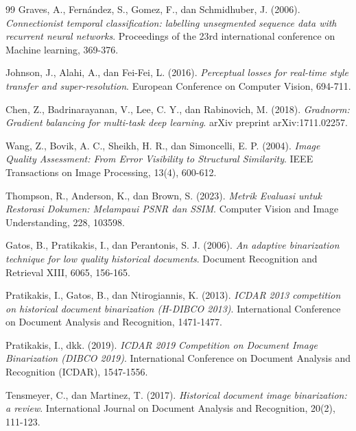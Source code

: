 \documentclass[12pt,a4paper]{book}
\begin{document}
\begin{thebibliography}{99}
Graves, A., Fernández, S., Gomez, F., dan Schmidhuber, J. (2006).
\textit{Connectionist temporal classification: labelling unsegmented sequence data with recurrent neural networks}.
Proceedings of the 23rd international conference on Machine learning, 369-376.

Johnson, J., Alahi, A., dan Fei-Fei, L. (2016).
\textit{Perceptual losses for real-time style transfer and super-resolution}.
European Conference on Computer Vision, 694-711.

Chen, Z., Badrinarayanan, V., Lee, C. Y., dan Rabinovich, M. (2018).
\textit{Gradnorm: Gradient balancing for multi-task deep learning}.
arXiv preprint arXiv:1711.02257.


Wang, Z., Bovik, A. C., Sheikh, H. R., dan Simoncelli, E. P. (2004).
\textit{Image Quality Assessment: From Error Visibility to Structural Similarity}.
IEEE Transactions on Image Processing, 13(4), 600-612.

Thompson, R., Anderson, K., dan Brown, S. (2023).
\textit{Metrik Evaluasi untuk Restorasi Dokumen: Melampaui PSNR dan SSIM}.
Computer Vision and Image Understanding, 228, 103598.


Gatos, B., Pratikakis, I., dan Perantonis, S. J. (2006).
\textit{An adaptive binarization technique for low quality historical documents}.
Document Recognition and Retrieval XIII, 6065, 156-165.

Pratikakis, I., Gatos, B., dan Ntirogiannis, K. (2013).
\textit{ICDAR 2013 competition on historical document binarization (H-DIBCO 2013)}.
International Conference on Document Analysis and Recognition, 1471-1477.

Pratikakis, I., dkk. (2019).
\textit{ICDAR 2019 Competition on Document Image Binarization (DIBCO 2019)}.
International Conference on Document Analysis and Recognition (ICDAR), 1547-1556.

Tensmeyer, C., dan Martinez, T. (2017).
\textit{Historical document image binarization: a review}.
International Journal on Document Analysis and Recognition, 20(2), 111-123.


\end{thebibliography}
\end{document}
